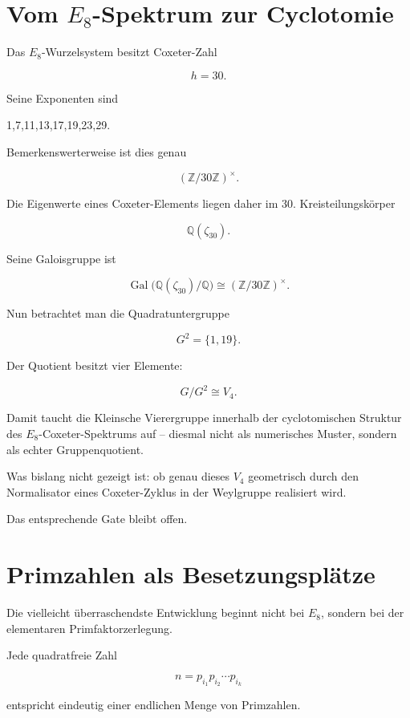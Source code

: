 \documentclass[11pt,a4paper]{article}
\begin{document}
\section{\texorpdfstring{Vom \(E_8\)-Spektrum zur Cyclotomie}{Vom E8-Spektrum zur Cyclotomie}}


Das \(E_8\)-Wurzelsystem besitzt Coxeter-Zahl


\[
h=30.
\]


Seine Exponenten sind


1,7,11,13,17,19,23,29.


Bemerkenswerterweise ist dies genau


\[
(\mathbb Z/30\mathbb Z)^\times.
\]


Die Eigenwerte eines Coxeter-Elements liegen daher im 30. Kreisteilungskörper


\[
\mathbb Q(\zeta_{30}).
\]


Seine Galoisgruppe ist


\[
\operatorname{Gal}
\bigl(
\mathbb Q(\zeta_{30})/\mathbb Q
\bigr)
\cong
(\mathbb Z/30\mathbb Z)^\times.
\]


Nun betrachtet man die Quadratuntergruppe


\[
G^2=\{1,19\}.
\]


Der Quotient besitzt vier Elemente:


\[
G/G^2\cong V_4.
\]


Damit taucht die Kleinsche Vierergruppe innerhalb der cyclotomischen Struktur des \(E_8\)-Coxeter-Spektrums auf – diesmal nicht als numerisches Muster, sondern als echter Gruppenquotient.


Was bislang nicht gezeigt ist: ob genau dieses \(V_4\) geometrisch durch den Normalisator eines Coxeter-Zyklus in der Weylgruppe realisiert wird.


Das entsprechende Gate bleibt offen.





\section{Primzahlen als Besetzungsplätze}


Die vielleicht überraschendste Entwicklung beginnt nicht bei \(E_8\), sondern bei der elementaren Primfaktorzerlegung.


Jede quadratfreie Zahl


\[
n=p_{i_1}p_{i_2}\cdots p_{i_k}
\]


entspricht eindeutig einer endlichen Menge von Primzahlen.
\end{document}
